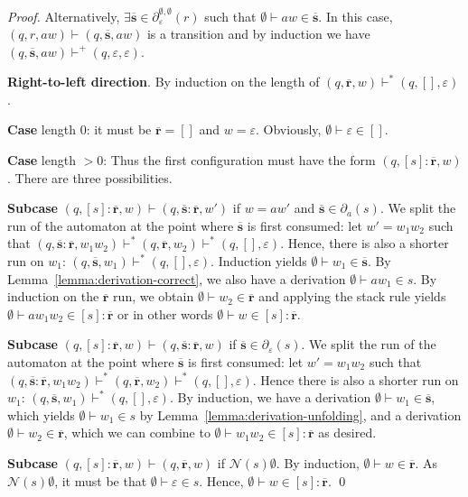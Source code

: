 \documentclass[runningheads, envcountsame, a4paper]{llncs}
\newcommand\pderiv[3][{}]{\partial^{#1}_{#3}(#2)}
\newcommand\PUSH{:}
\newcommand\SINGLETON[1]{{[#1]}}
\newcommand\Null{\mathcal{N}}
\newcommand\RS{\ensuremath{\overline{\mathbf{r}}}}
\renewcommand\SS{\ensuremath{\overline{\mathbf{s}}}}
\begin{document}
\begin{proof}
  Alternatively, $\exists\SS\in\pderiv[\emptyset,\emptyset]{r}
  \varepsilon$ such that $\emptyset \vdash aw \in \SS$. In this
  case, $(q, r, aw) \vdash (q, \SS, aw)$ is a transition and by
  induction we have $(q, \SS, aw) \vdash^+ (q, \varepsilon,
  \varepsilon)$.

  \textbf{Right-to-left direction}. By induction on the
  length of $(q, \RS, w) \vdash^*   (q, \SINGLETON{}, \varepsilon)$.

  \textbf{Case }length $0$: it must be $\RS=\SINGLETON{}$ and
  $w=\varepsilon$. Obviously, $\emptyset \vdash \varepsilon \in
  \SINGLETON{}$.

  \textbf{Case }length $>0$: Thus the first configuration must have
  the form $(q, \SINGLETON{s}\PUSH\RS, w)$. There are three
  possibilities.

  \textbf{Subcase }$(q, \SINGLETON{s}\PUSH\RS, w) \vdash (q, \SS\PUSH
  \RS, w')$ if $w=aw'$ and $\SS \in \pderiv s a$. We split the run of
  the automaton at the point where $\SS$ is first consumed: let $w' = w_1w_2$
  such that $(q, \SS\PUSH\RS, w_1w_2) \vdash^* (q, \RS, w_2) \vdash^*
  (q, \SINGLETON{}, \varepsilon)$.
  Hence, there is also a shorter run on $w_1$: $(q, \SS, w_1) \vdash^* (q,
  \SINGLETON{}, \varepsilon)$. Induction yields $\emptyset \vdash w_1
  \in \SS$. By Lemma~\ref{lemma:derivation-correct}, we also have a
  derivation $\emptyset \vdash aw_1 \in s$. By induction on the $\RS$
  run, we obtain $\emptyset \vdash w_2 \in \RS$ and applying the stack
  rule yields $\emptyset \vdash aw_1w_2 \in \SINGLETON{s}\PUSH\RS$ or
  in other words $\emptyset \vdash w \in \SINGLETON{s}\PUSH\RS$.

  \textbf{Subcase }$(q, \SINGLETON{s}\PUSH\RS, w) \vdash (q, \SS\PUSH
  \RS, w)$ if $\SS \in \pderiv s \varepsilon$. We split the run of the
  automaton at the point where $\SS$ is first consumed: let $w' =
  w_1w_2$ such that  $(q, \SS\PUSH\RS, w_1w_2) \vdash^* (q, \RS, w_2) \vdash^*
  (q, \SINGLETON{}, \varepsilon)$. Hence there is also a shorter run
  on $w_1$: $(q, \SS, w_1) \vdash^* (q, \SINGLETON{},
  \varepsilon)$. By induction, we have a
  derivation $\emptyset \vdash w_1 \in \SS$, which yields $\emptyset
  \vdash w_1\in s$ by Lemma~\ref{lemma:derivation-unfolding}, and a derivation
  $\emptyset \vdash w_2 \in \RS$, which we can combine to $\emptyset \vdash
  w_1w_2 \in \SINGLETON{s}\PUSH \RS$ as desired.

  \textbf{Subcase }$(q, \SINGLETON{s}\PUSH\RS, w) \vdash (q, 
  \RS, w)$ if $\Null (s)\emptyset$. By induction, $\emptyset \vdash w
  \in \RS$. As $\Null (s)\emptyset$, it must be that $\emptyset \vdash
  \varepsilon \in s$. Hence, $\emptyset \vdash w\in \SINGLETON{s}\PUSH
  \RS$.
  \qed
\end{proof}
\end{document}
